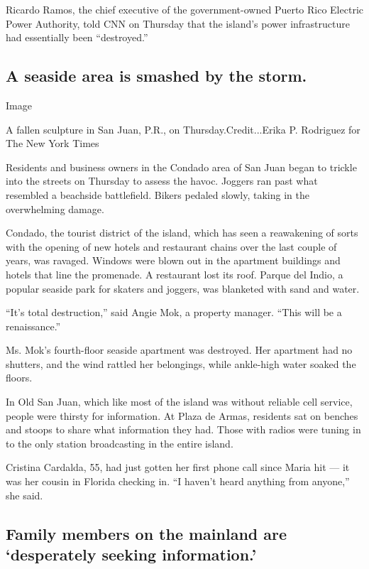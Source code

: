Ricardo Ramos, the chief executive of the government-owned Puerto Rico
Electric Power Authority, told CNN on Thursday that the island's power
infrastructure had essentially been ``destroyed.''

\hypertarget{a-seaside-area-is-smashed-by-the-storm}{%
\subsection{A seaside area is smashed by the
storm.}\label{a-seaside-area-is-smashed-by-the-storm}}

Image

A fallen sculpture in San Juan, P.R., on Thursday.Credit...Erika P.
Rodriguez for The New York Times

Residents and business owners in the Condado area of San Juan began to
trickle into the streets on Thursday to assess the havoc. Joggers ran
past what resembled a beachside battlefield. Bikers pedaled slowly,
taking in the overwhelming damage.

Condado, the tourist district of the island, which has seen a
reawakening of sorts with the opening of new hotels and restaurant
chains over the last couple of years, was ravaged. Windows were blown
out in the apartment buildings and hotels that line the promenade. A
restaurant lost its roof. Parque del Indio, a popular seaside park for
skaters and joggers, was blanketed with sand and water.

``It's total destruction,'' said Angie Mok, a property manager. ``This
will be a renaissance.''

Ms. Mok's fourth-floor seaside apartment was destroyed. Her apartment
had no shutters, and the wind rattled her belongings, while ankle-high
water soaked the floors.

In Old San Juan, which like most of the island was without reliable cell
service, people were thirsty for information. At Plaza de Armas,
residents sat on benches and stoops to share what information they had.
Those with radios were tuning in to the only station broadcasting in the
entire island.

Cristina Cardalda, 55, had just gotten her first phone call since Maria
hit --- it was her cousin in Florida checking in. ``I haven't heard
anything from anyone,'' she said.

\hypertarget{family-members-on-the-mainland-are-desperately-seeking-information}{%
\subsection{Family members on the mainland are `desperately seeking
information.'}\label{family-members-on-the-mainland-are-desperately-seeking-information}}

